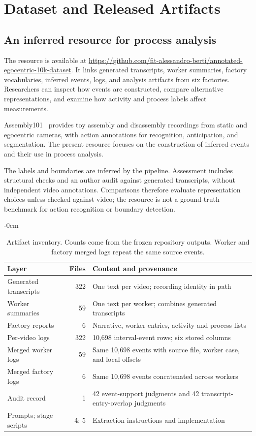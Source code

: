 \section{Dataset and Released Artifacts}
\label{sec:resource}
\subsection{An inferred resource for process analysis}
The resource is available at \url{https://github.com/fit-alessandro-berti/annotated-egocentric-10k-dataset}. It links generated transcripts, worker summaries, factory vocabularies, inferred events, logs, and analysis artifacts from six factories. Researchers can inspect how events are constructed, compare alternative representations, and examine how activity and process labels affect measurements.

Assembly101~\cite{sener2022assembly101} provides toy assembly and disassembly recordings from static and egocentric cameras, with action annotations for recognition, anticipation, and segmentation. The present resource focuses on the construction of inferred events and their use in process analysis.

The labels and boundaries are inferred by the pipeline. Assessment includes structural checks and an author audit against generated transcripts, without independent video annotations. Comparisons therefore evaluate representation choices unless checked against video; the resource is not a ground-truth benchmark for action recognition or boundary detection.

\begin{table}[!b]\begin{adjustwidth}{-\extralength}{0cm}
\caption{Artifact inventory. Counts come from the frozen repository outputs. Worker and factory merged logs repeat the same source events.}
\label{tab:inventory}\small
\begin{tabularx}{\linewidth}{@{}l r L@{}}\toprule
Layer & Files & Content and provenance \\\midrule
Generated transcripts & 322 & One text per video; recording identity in path \\
Worker summaries & 59 & One text per worker; combines generated transcripts \\
Factory reports & 6 & Narrative, worker entries, activity and process lists \\
Per-video logs & 322 & 10{,}698 interval-event rows; six stored columns \\
Merged worker logs & 59 & Same 10{,}698 events with source file, worker case, and local offsets \\
Merged factory logs & 6 & Same 10{,}698 events concatenated across workers \\
Audit record & 1 & 42 event-support judgments and 42 transcript-entry-overlap judgments \\
Prompts; stage scripts & 4; 5 & Extraction instructions and implementation \\
\bottomrule\end{tabularx}
\end{adjustwidth}\end{table}

